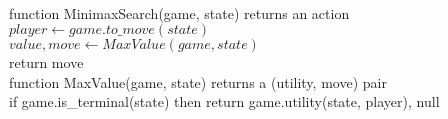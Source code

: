 \documentclass[preview]{standalone}
\begin{document}
\begin{center}
\quad\\function MinimaxSearch(game, state) returns an action\quad\\$player \gets game.to\_move(state)$\quad\\$value, move \gets MaxValue(game, state)$\quad\\return move\quad\\function MaxValue(game, state) returns a (utility, move) pair\quad\\if game.is\_terminal(state) then return game.utility(state, player), null
\end{center}
\end{document}
